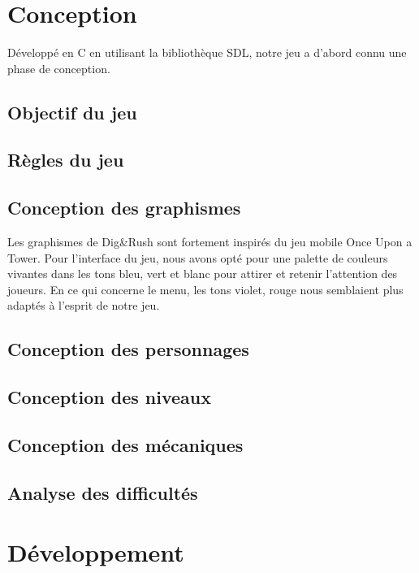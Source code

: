 \documentclass[a4paper,12pt]{article}
\begin{document}
\section{Conception}

Développé en C en utilisant la bibliothèque SDL, notre jeu a d'abord connu une phase de conception.

\subsection{Objectif du jeu}
\subsection{Règles du jeu}
\subsection{Conception des graphismes}
Les graphismes de Dig&Rush sont fortement inspirés du jeu mobile Once Upon a Tower.
Pour l'interface du jeu, nous avons opté pour une palette de couleurs vivantes dans les tons bleu, vert et blanc pour attirer et retenir l'attention des joueurs.
En ce qui concerne le menu, les tons violet, rouge nous semblaient plus adaptés à l'esprit de notre jeu.\\
\subsection{Conception des personnages}
\subsection{Conception des niveaux}
\subsection{Conception des mécaniques}
\subsection{Analyse des difficultés}



\section{Développement}
\end{document}
